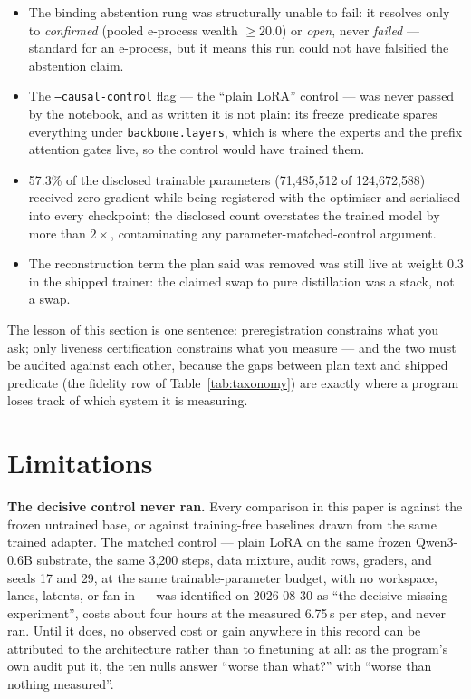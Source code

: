 \documentclass[10pt,a4paper]{article}
\begin{document}
\begin{itemize}
  \item The binding abstention rung was structurally unable to fail: it resolves only to \emph{confirmed} (pooled e-process wealth $\ge 20.0$) or \emph{open}, never \emph{failed} --- standard for an e-process, but it means this run could not have falsified the abstention claim.
  \item The \texttt{--causal-control} flag --- the ``plain LoRA'' control --- was never passed by the notebook, and as written it is not plain: its freeze predicate spares everything under \texttt{backbone.layers}, which is where the experts and the prefix attention gates live, so the control would have trained them.
  \item 57.3\% of the disclosed trainable parameters (71{,}485{,}512 of 124{,}672{,}588) received zero gradient while being registered with the optimiser and serialised into every checkpoint; the disclosed count overstates the trained model by more than $2\times$, contaminating any parameter-matched-control argument.
  \item The reconstruction term the plan said was removed was still live at weight 0.3 in the shipped trainer: the claimed swap to pure distillation was a stack, not a swap.
\end{itemize}

The lesson of this section is one sentence: preregistration \cite{vanmiltenburg2021} constrains what you ask; only liveness certification constrains what you measure --- and the two must be audited against each other, because the gaps between plan text and shipped predicate (the fidelity row of Table~\ref{tab:taxonomy}) are exactly where a program loses track of which system it is measuring.


\section{Limitations}\label{sec:limitations}

\textbf{The decisive control never ran.} Every comparison in this paper is against the frozen untrained base, or against training-free baselines drawn from the same trained adapter. The matched control --- plain LoRA on the same frozen Qwen3-0.6B substrate, the same 3,200 steps, data mixture, audit rows, graders, and seeds 17 and 29, at the same trainable-parameter budget, with no workspace, lanes, latents, or fan-in --- was identified on 2026-08-30 as ``the decisive missing experiment'', costs about four hours at the measured 6.75\,s per step, and never ran. Until it does, no observed cost or gain anywhere in this record can be attributed to the architecture rather than to finetuning at all: as the program's own audit put it, the ten nulls answer ``worse than what?'' with ``worse than nothing measured''.
\end{document}
